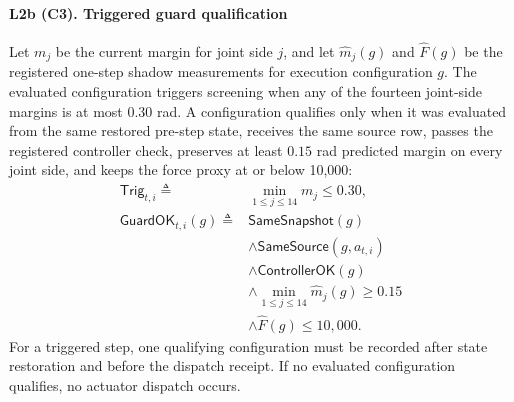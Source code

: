 \paragraph{L2b (C3). Triggered guard qualification}
Let $m_j$ be the current margin for joint side $j$, and let
$\widehat m_j(g)$ and $\widehat F(g)$ be the registered one-step shadow
measurements for execution configuration $g$.  The evaluated configuration
triggers screening when any of the fourteen joint-side margins is at most
$0.30$ rad.  A configuration qualifies only when it was evaluated from the same
restored pre-step state, receives the same source row, passes the registered
controller check, preserves at least $0.15$ rad predicted margin on every joint
side, and keeps the force proxy at or below 10,000:
\begin{align}
\mathsf{Trig}_{t,i} \triangleq{}&
\min_{1\leq j\leq14}m_j\leq0.30,
\label{eq:guard-trigger}\\
\mathsf{GuardOK}_{t,i}(g) \triangleq{}&
\mathsf{SameSnapshot}(g) \nonumber\\
&\land\mathsf{SameSource}(g,a_{t,i}) \nonumber\\
&\land\mathsf{ControllerOK}(g) \nonumber\\
&\land\min_{1\leq j\leq14}\widehat m_j(g)\geq0.15 \nonumber\\
&\land\widehat F(g)\leq10{,}000.
\label{eq:guard-qualified}
\end{align}
For a triggered step, one qualifying configuration must be recorded after state
restoration and before the dispatch receipt.  If no evaluated configuration
qualifies, no actuator dispatch occurs.

